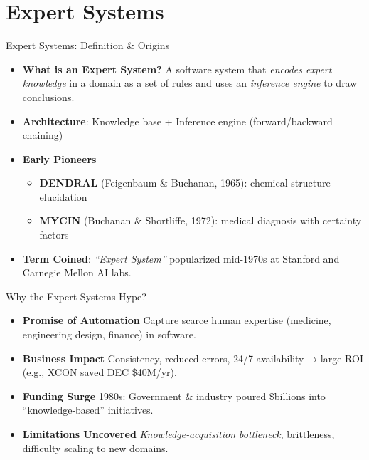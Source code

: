 \documentclass[german,10pt]{beamer}
\begin{document}
\section{Expert Systems}
\begin{frame}{Expert Systems: Definition \& Origins}
  \begin{itemize}
    \item \textbf{What is an Expert System?}  
      A software system that \emph{encodes expert knowledge} in a domain as a set of rules and uses an \emph{inference engine} to draw conclusions.
    \item \textbf{Architecture}: Knowledge base + Inference engine (forward/backward chaining)
    \item \textbf{Early Pioneers}  
      \begin{itemize}
        \item \textbf{DENDRAL} (Feigenbaum \& Buchanan, 1965): chemical‐structure elucidation  
        \item \textbf{MYCIN} (Buchanan \& Shortliffe, 1972): medical diagnosis with certainty factors  
      \end{itemize}
    \item \textbf{Term Coined}:  
      \emph{“Expert System”} popularized mid-1970s at Stanford and Carnegie Mellon AI labs.
  \end{itemize}
\end{frame}

\begin{frame}{Why the Expert Systems Hype?}
  \begin{itemize}
    \item \textbf{Promise of Automation}  
      Capture scarce human expertise (medicine, engineering design, finance) in software.
    \item \textbf{Business Impact}  
      Consistency, reduced errors, 24/7 availability → large ROI (e.g., XCON saved DEC \$40M/yr).
    \item \textbf{Funding Surge}  
      1980s: Government \& industry poured \$billions into “knowledge-based” initiatives.
    \item \textbf{Limitations Uncovered}  
      \emph{Knowledge‐acquisition bottleneck}, brittleness, difficulty scaling to new domains.
  \end{itemize}
\end{frame}
\end{document}
